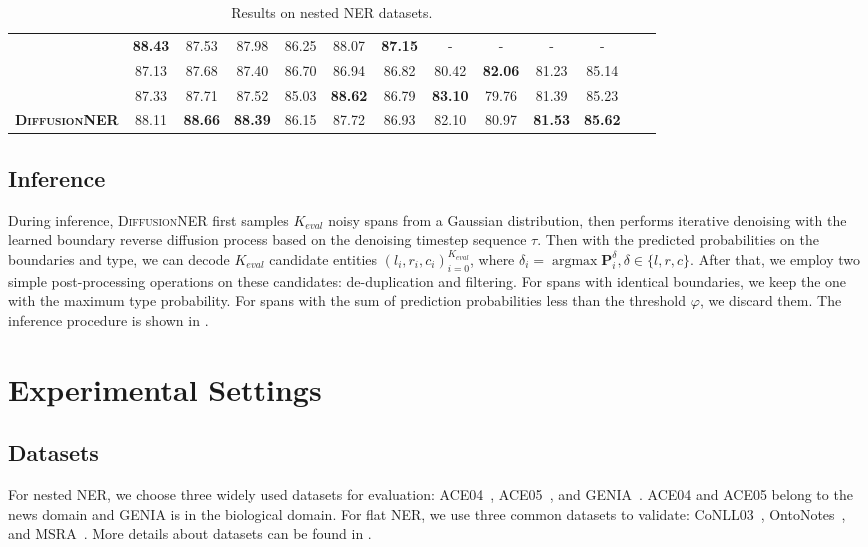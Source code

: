 \documentclass[11pt]{article}
\begin{document}
\begin{table*}[]
\begin{tabular}{lcccccccccccc}
  \citet{zhu-li-2022-boundary} & \textbf{88.43} & 87.53 &  87.98 & 86.25 &  88.07 &  \textbf{87.15} &  - &  - &  - & -\\
  \citet{yuan-etal-2022-fusing} & 87.13 &  87.68 &  87.40 &  86.70 &  86.94 &  86.82 & 80.42 & \textbf{82.06} & 81.23 & {85.14} \\
  \citet{li2022unified} & 87.33 &  87.71 &  87.52 & 85.03 & \textbf{88.62} &  86.79 & \textbf{83.10} & 79.76 & {81.39} & {85.23} \\
\midrule
\textbf{\textsc{DiffusionNER}} & 88.11 & \textbf{88.66} & \textbf{88.39} &  86.15 & 87.72 & 86.93 & 82.10 & 80.97 & \textbf{81.53} &\textbf{85.62}\\
\bottomrule
\end{tabular}
\caption{Results on {nested} NER datasets.}
\label{tab:nested}
\end{table*}




\subsection{Inference}
\label{sec:3.4}

During inference, \textsc{DiffusionNER} first samples $K_{eval}$ noisy spans from a Gaussian distribution, then performs iterative denoising with the learned boundary reverse diffusion process based on the denoising timestep sequence $\tau$.
Then with the predicted probabilities on the boundaries and type, we can decode $K_{eval}$ candidate entities ${(l_i, r_i, c_i)}^{K_{eval}}_{i=0}$, where $\delta_i = \operatorname{argmax}\mathbf{P}_i^\delta, \delta \in \{l, r, c\}$.
After that, we employ two simple post-processing operations on these candidates: de-duplication and filtering. For spans with identical boundaries, we keep the one with the maximum type probability. For spans with the sum of prediction probabilities less than the threshold $\varphi$, we discard them. The inference procedure is shown in .


\section{Experimental Settings}

\subsection{Datasets}

For nested NER, we choose three widely used datasets for evaluation: ACE04~\citep{ doddington-etal-2004-automatic}, ACE05~\citep{2005-automatic}, and GENIA~\citep{10.5555/1289189.1289260}. ACE04 and ACE05 belong to the news domain and GENIA is in the biological domain. For flat NER, we use three common datasets to validate: CoNLL03~\citep{tjong-kim-sang-de-meulder-2003-introduction}, OntoNotes~\citep{pradhan-etal-2013-towards}, and MSRA~\citep{levow-2006-third}. More details about datasets can be found in .
\end{document}
